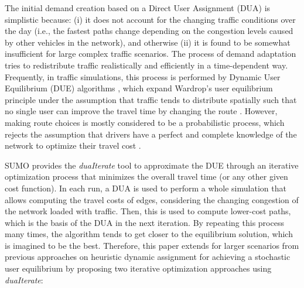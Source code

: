 The initial demand creation based on a Direct User Assignment (DUA) is simplistic because: (i) it does not account for the changing traffic conditions over the day (i.e., the fastest paths change depending on the congestion levels caused by other vehicles in the network), and otherwise (ii) it is found to be somewhat insufficient for large complex traffic scenarios. The process of demand adaptation tries to redistribute traffic realistically and efficiently in a time-dependent way. Frequently, in traffic simulations, this process is performed by Dynamic User Equilibrium (DUE) algorithms \citep{GermanAerospaceCenterDLRandothers2021e}, which expand Wardrop’s user equilibrium principle under the assumption that traffic tends to distribute spatially such that no single user can improve the travel time by changing the route \citep{Wardrop1952}. However, making route choices is mostly considered to be a probabilistic process, which rejects the assumption that drivers have a perfect and complete knowledge of the network to optimize their travel cost \citep{Daganzo1977}.

SUMO provides the \emph{duaIterate} tool to approximate the DUE \citep{GermanAerospaceCenterDLRandothers2021e} through an iterative optimization process that minimizes the overall travel time (or any other given cost function). In each run, a DUA is used to perform a whole simulation that allows computing the travel costs of edges, considering the changing congestion of the network loaded with traffic. Then, this is used to compute lower-cost paths, which is the basis of the DUA in the next iteration. By repeating this process many times, the algorithm tends to get closer to the equilibrium solution, which is imagined to be the best. Therefore, this paper extends for larger scenarios from previous approaches on heuristic dynamic assignment for achieving a stochastic user equilibrium \citep{Barcelo2006} by proposing two iterative optimization approaches using \emph{duaIterate}:

